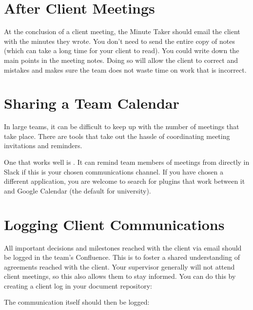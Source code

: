 \documentclass[letterpaper,10pt,english]{jupyterBook}
\begin{document}
\section{After Client Meetings}
\label{\detokenize{chapter_2/client_communications:after-client-meetings}}
\sphinxAtStartPar
At the conclusion of a client meeting, the Minute Taker should email the
client with the minutes they wrote. You don’t need to send the entire
copy of notes (which can take a long time for your client to read). You
could write down the main points in the meeting notes. Doing so will
allow the client to correct and mistakes and makes sure the team does
not waste time on work that is incorrect.


\section{Sharing a Team Calendar}
\label{\detokenize{chapter_2/client_communications:sharing-a-team-calendar}}
\sphinxAtStartPar
In large teams, it can be difficult to keep up with the number of
meetings that take place. There are tools that take out the hassle of
coordinating meeting invitations and reminders.

\sphinxAtStartPar
One that works well is .
It can remind team members of meetings from directly in Slack if this is
your chosen communications channel. If you have chosen a different
application, you are welcome to search for plug\sphinxhyphen{}ins that work between it
and Google Calendar (the default for university).


\section{Logging Client Communications}
\label{\detokenize{chapter_2/client_communications:logging-client-communications}}
\sphinxAtStartPar
All important decisions and milestones reached with the client via email
should be logged in the team’s Confluence. This is to foster a shared
understanding of agreements reached with the client. Your supervisor
generally will not attend client meetings, so this also allows them to
stay informed. You can do this by creating a client log in your document
repository:

\sphinxAtStartPar
{}

\sphinxAtStartPar
The communication itself should then be logged:
\end{document}
